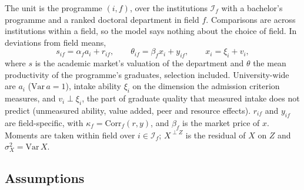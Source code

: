 \documentclass[11pt]{article}
\begin{document}
The unit is the programme $(i,f)$, over the institutions $\mathcal I_f$ with a bachelor's programme and a ranked
doctoral department in field $f$. Comparisons are across institutions within a field, so the model says nothing
about the choice of field. In deviations from field means,
\begin{equation}\label{eq:latent}
s_{if}=\alpha_fa_i+r_{if},\qquad \theta_{if}=\beta_fx_i+y_{if},\qquad x_i=\xi_i+v_i,
\end{equation}
where $s$ is the academic market's valuation of the department and $\theta$ the mean productivity of the
programme's graduates, selection included. University-wide are $a_i$ ($\mathrm{Var}\,a=1$), intake ability
$\xi_i$ on the dimension the admission criterion measures, and $v_i\perp\xi_i$, the part of graduate quality that
measured intake does not predict (unmeasured ability, value added, peer and resource effects). $r_{if}$ and
$y_{if}$ are field-specific, with $\kappa_f=\mathrm{Corr}_f(r,y)$, and $\beta_f$ is the market price of $x$. Moments are taken
within field over $i\in\mathcal I_f$; $X^{\perp Z}$ is the residual of $X$ on $Z$ and $\sigma_X^2=\mathrm{Var}\,X$.

\subsection{Assumptions}
\end{document}
